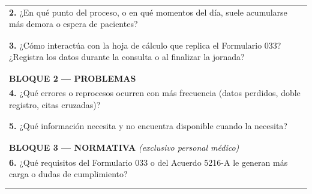 \begin{longtable}{|p{\fichawidth}|}
\underline{\hspace{\linewidth}} \\
\hline
\textbf{2.} ¿En qué punto del proceso, o en qué momentos del día, suele acumularse más demora o espera de pacientes? \\[4pt]
\underline{\hspace{\linewidth}} \\
\underline{\hspace{\linewidth}} \\
\hline
\textbf{3.} ¿Cómo interactúa con la hoja de cálculo que replica el Formulario 033? ¿Registra los datos durante la consulta o al finalizar la jornada? \\[4pt]
\underline{\hspace{\linewidth}} \\
\underline{\hspace{\linewidth}} \\
\hline
\cellcolor{gray!10}\textbf{BLOQUE 2 — PROBLEMAS} \\
\hline
\textbf{4.} ¿Qué errores o reprocesos ocurren con más frecuencia (datos perdidos, doble registro, citas cruzadas)? \\[4pt]
\underline{\hspace{\linewidth}} \\
\underline{\hspace{\linewidth}} \\
\hline
\textbf{5.} ¿Qué información necesita y no encuentra disponible cuando la necesita? \\[4pt]
\underline{\hspace{\linewidth}} \\
\underline{\hspace{\linewidth}} \\
\hline
\cellcolor{gray!10}\textbf{BLOQUE 3 — NORMATIVA} \textit{(exclusivo personal médico)} \\
\hline
\textbf{6.} ¿Qué requisitos del Formulario 033 o del Acuerdo 5216-A le generan más carga o dudas de cumplimiento? \\[4pt]
\underline{\hspace{\linewidth}} \\
\underline{\hspace{\linewidth}} \\
\hline
\end{longtable}

\vspace{1cm}


